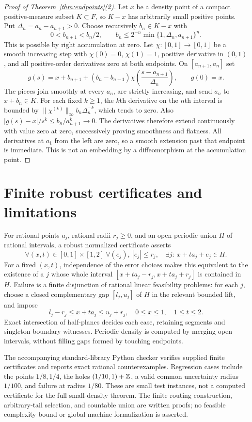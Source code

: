 \documentclass[11pt]{article}
\theoremstyle{remark}\newtheorem{remark}[theorem]{Remark}
\begin{document}
\begin{proof}[Proof of Theorem~\ref{thm:endpoints}(2)]
Let $x$ be a density point of a compact positive-measure subset $K\subset F$, so $K-x$ has arbitrarily small positive points. Put $\Delta_n=a_n-a_{n+1}>0$. Choose recursively $b_n\in K-x$ with
\[
 0<b_{n+1}<b_n/2,\qquad
 b_n\le2^{-n}\min\{1,\Delta_n,a_{n+1}\}^{n}.
\]
This is possible by right accumulation at zero. Let $\chi:[0,1]\to[0,1]$ be a smooth increasing step with $\chi(0)=0$, $\chi(1)=1$, positive derivative in $(0,1)$, and all positive-order derivatives zero at both endpoints. On $[a_{n+1},a_n]$ set
\[
 g(s)=x+b_{n+1}+(b_n-b_{n+1})
              \chi\left(\frac{s-a_{n+1}}{\Delta_n}\right),
 \qquad g(0)=x.
\]
The pieces join smoothly at every $a_n$, are strictly increasing, and send $a_n$ to $x+b_n\in K$. For each fixed $k\ge1$, the $k$th derivative on the $n$th interval is bounded by
$\|\chi^{(k)}\|_\infty b_n\Delta_n^{-k}$, which tends to zero. Also $|g(s)-x|/s^k\le b_n/a_{n+1}^k\to0$. The derivatives therefore extend continuously with value zero at zero, successively proving smoothness and flatness. All derivatives at $a_1$ from the left are zero, so a smooth extension past that endpoint is immediate. This is not an embedding by a diffeomorphism at the accumulation point.
\end{proof}

\section{Finite robust certificates and limitations}
For rational points $a_j$, rational radii $r_j\ge0$, and an open periodic union $H$ of rational intervals, a robust normalized certificate asserts
\[
 \forall(x,t)\in[0,1]\times[1,2]\ \forall(e_j),\ |e_j|\le r_j,
 \quad\exists j:\ x+ta_j+e_j\in H.
\]
For a fixed $(x,t)$, independence of the error choices makes this equivalent to the existence of a $j$ whose whole interval
$[x+ta_j-r_j,x+ta_j+r_j]$ is contained in $H$. Failure is a finite disjunction of rational linear feasibility problems: for each $j$, choose a closed complementary gap $[l_j,u_j]$ of $H$ in the relevant bounded lift, and impose
\[
 l_j-r_j\le x+ta_j\le u_j+r_j,
 \quad 0\le x\le1,\quad1\le t\le2.
\]
Exact intersection of half-planes decides each case, retaining segments and singleton boundary witnesses. Periodic density is computed by merging open intervals, without filling gaps formed by touching endpoints.

The accompanying standard-library Python checker verifies supplied finite certificates and reports exact rational counterexamples. Regression cases include the points $1/8,1/4$, the holes $(1/10,1)+\mathbb Z$, a valid common uncertainty radius $1/100$, and failure at radius $1/80$. These are small test instances, not a computed certificate for the full small-density theorem. The finite routing construction, arbitrary-tail selection, and countable union are written proofs; no feasible complexity bound or global machine formalization is asserted.
\end{document}
